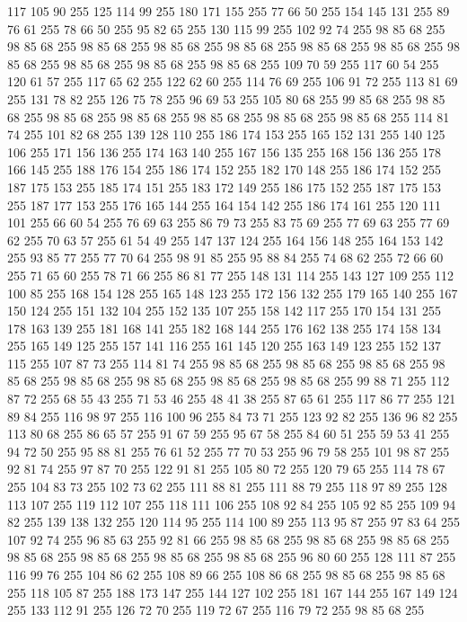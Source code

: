 117 105 90 255 125 114 99 255 180 171 155 255 77 66 50 255 154 145 131 255 89 76 61 255 78 66 50 255 95 82 65 255 130 115 99 255 102 92 74 255 98 85 68 255 98 85 68 255 98 85 68 255 98 85 68 255 98 85 68 255 98 85 68 255 98 85 68 255 98 85 68 255 98 85 68 255 98 85 68 255 98 85 68 255 109 70 59 255 117 60 54 255 120 61 57 255 117 65 62 255 122 62 60 255 114 76 69 255 106 91 72 255 113 81 69 255 131 78 82 255 126 75 78 255 96 69 53 255 105 80 68 255 99 85 68 255 98 85 68 255 98 85 68 255 98 85 68 255 98 85 68 255 98 85 68 255 98 85 68 255 114 81 74 255 101 82 68 255 139 128 110 255 186 174 153 255 165 152 131 255 140 125 106 255 171 156 136 255 174 163 140 255 167 156 135 255 168 156 136 255 178 166 145 255 188 176 154 255 186 174 152 255 182 170 148 255 186 174 152 255 187 175 153 255 185 174 151 255 183 172 149 255 186 175 152 255 187 175 153 255 187 177 153 255 176 165 144 255 164 154 142 255 186 174 161 255
120 111 101 255 66 60 54 255 76 69 63 255 86 79 73 255 83 75 69 255 77 69 63 255 77 69 62 255 70 63 57 255 61 54 49 255 147 137 124 255 164 156 148 255 164 153 142 255 93 85 77 255 77 70 64 255 98 91 85 255 95 88 84 255 74 68 62 255 72 66 60 255 71 65 60 255 78 71 66 255 86 81 77 255 148 131 114 255 143 127 109 255 112 100 85 255 168 154 128 255 165 148 123 255 172 156 132 255 179 165 140 255 167 150 124 255 151 132 104 255 152 135 107 255 158 142 117 255 170 154 131 255 178 163 139 255 181 168 141 255 182 168 144 255 176 162 138 255 174 158 134 255 165 149 125 255 157 141 116 255 161 145 120 255 163 149 123 255 152 137 115 255 107 87 73 255 114 81 74 255 98 85 68 255 98 85 68 255 98 85 68 255 98 85 68 255 98 85 68 255 98 85 68 255 98 85 68 255 98 85 68 255 99 88 71 255 112 87 72 255 68 55 43 255 71 53 46 255 48 41 38 255 87 65 61 255 117 86 77 255 121 89 84 255 116 98 97 255 116 100 96 255 84 73 71 255
123 92 82 255 136 96 82 255 113 80 68 255 86 65 57 255 91 67 59 255 95 67 58 255 84 60 51 255 59 53 41 255 94 72 50 255 95 88 81 255 76 61 52 255 77 70 53 255 96 79 58 255 101 98 87 255 92 81 74 255 97 87 70 255 122 91 81 255 105 80 72 255 120 79 65 255 114 78 67 255 104 83 73 255 102 73 62 255 111 88 81 255 111 88 79 255 118 97 89 255 128 113 107 255 119 112 107 255 118 111 106 255 108 92 84 255 105 92 85 255 109 94 82 255 139 138 132 255 120 114 95 255 114 100 89 255 113 95 87 255 97 83 64 255 107 92 74 255 96 85 63 255 92 81 66 255 98 85 68 255 98 85 68 255 98 85 68 255 98 85 68 255 98 85 68 255 98 85 68 255 98 85 68 255 96 80 60 255 128 111 87 255 116 99 76 255 104 86 62 255 108 89 66 255 108 86 68 255 98 85 68 255 98 85 68 255 118 105 87 255 188 173 147 255 144 127 102 255 181 167 144 255 167 149 124 255 133 112 91 255 126 72 70 255 119 72 67 255 116 79 72 255 98 85 68 255
